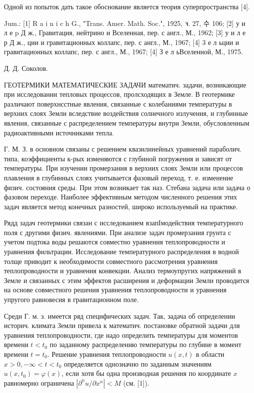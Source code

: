 \documentclass[10pt]{article}
\begin{document}
Одной из попыток дать такое обоснование является теория суперпространства [4].



Jum.: [1] R a i n i c h G., "Trans. Amer. Math. Soc.", 1925, จ. 27, 수 106; [2] у и л е $\mathrm{p}$ Д ж., Гравитация, нейтрино и Вселенная, пер. с англ., М., 1962; [3] у и л е р Д ж., ции и гравитационных коллапс, пер. с англ., М., 1967; [4] 3 е л ьции и гравитационных коллапс, пер. с англ., М., 1967; [4] З е л ьВселенной, М., 1975.



Д. Д. Соколов.



ГЕОТЕРМИКИ МАТЕМАТИЧЕСКИЕ ЗАДАЧИ математич. задачи, возникающие при исследовании тепловых процессов, пролсходящих в Земле. В геотермике различают поверхнсстные явления, связанные с колебаниями температуры в верхних слоях Земли вследствие воздействия солнечного излучения, и глубинные явления, связанные с распределением температуры внутри Земли, обусловленным радиоактивными источниками тепла.



Г. М. З. в основном связаны с решением квазилинейных уравнений параболич. типа, коэффициенты к-рых изменяются с глубиной погружения и зависят от температуры. При изучении промерзания в верхних слоях Земли или процессов плавления в глубинных слоях учитывается фазовый переход, т. е. изменение физич. состояния среды. При этом возникает так наз. Стебана задача или задача о фазовом переходе. Наиболее эффективным методом численного решения этих задач является метод конечных разностей, широко используемый на практике.



Рядд задач геотермики связан с исследованием взапІмодействия температурного поля с другими физич. явлениями. При анализе задач промерзания грунта с учетом подтока воды решаются совместно уравнения теплопроводности и уравнения фильтрации. Исследование температурного распределения в водной толще приводит к необходимости совместного рассмотрения уравнения теплопроводности и уравнения конвекции. Анализ термоупругих напряжений в Земле и связанных с этим эффектов расширения и деформации Земли проводится на основе совместного решения уравнения теплопроводности и уравнения упругого равновесия в гравитационном поле.



Среди Г. м. з. имеется ряд специфических задач. Так, задача об определении историч. климата Земли привела к математич. постановке обратной задачи для уравнения теплопроводности, где надо определить температуры для моментов времени $t<t_{0}$ по заданному распределению температуры по глубине в момент времени $t=t_{0}$. Решение уравнения теплопроводности $u(x, t)$ в области $x>0,-\infty<t<t_{0}$ определяется однозначно по заданным значениям $u\left(x, t_{0}\right)=\varphi(x)$, если хотя бы одна производная решения по координате $x$ равномерно ограничена $\left|\partial^{n} u / \partial x^{n}\right|<M$ (см. [1]).
\end{document}
